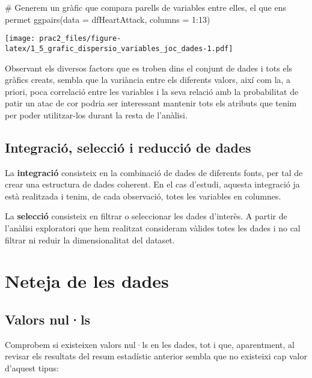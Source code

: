 \documentclass[
]{article}
\newenvironment{Shaded}{\begin{snugshade}}{\end{snugshade}}
\newcommand{\AttributeTok}[1]{\textcolor[rgb]{0.80,0.80,0.80}{#1}}
\newcommand{\CommentTok}[1]{\textcolor[rgb]{0.50,0.62,0.50}{#1}}
\newcommand{\DecValTok}[1]{\textcolor[rgb]{0.86,0.86,0.80}{#1}}
\newcommand{\FunctionTok}[1]{\textcolor[rgb]{0.94,0.94,0.56}{#1}}
\newcommand{\NormalTok}[1]{\textcolor[rgb]{0.80,0.80,0.80}{#1}}
\newcommand{\SpecialCharTok}[1]{\textcolor[rgb]{0.86,0.64,0.64}{#1}}
\begin{document}
\begin{Shaded}
\begin{Highlighting}[]
\CommentTok{\# Generem un gràfic que compara parells de variables entre elles, el que ens permet}
\FunctionTok{ggpairs}\NormalTok{(}\AttributeTok{data =}\NormalTok{ dfHeartAttack, }\AttributeTok{columns =} \DecValTok{1}\SpecialCharTok{:}\DecValTok{13}\NormalTok{)}
\end{Highlighting}
\end{Shaded}

\texttt{[image: prac2\_files/figure-latex/1\_5\_grafic\_dispersio\_variables\_joc\_dades-1.pdf]}

Observant els diversos factors que es troben dins el conjunt de dades i
tots els gràfics creats, sembla que la variància entre els diferents
valors, així com la, a priori, poca correlació entre les variables i la
seva relació amb la probabilitat de patir un atac de cor podria ser
interessant mantenir tots els atributs que tenim per poder utilitzar-los
durant la resta de l'anàlisi.

\hypertarget{integraciuxf3-selecciuxf3-i-reducciuxf3-de-dades}{%
\subsection{Integració, selecció i reducció de
dades}\label{integraciuxf3-selecciuxf3-i-reducciuxf3-de-dades}}

La \textbf{integració} consisteix en la combinació de dades de diferents
fonts, per tal de crear una estructura de dades coherent. En el cas
d'estudi, aquesta integració ja està realitzada i tenim, de cada
observació, totes les variables en columnes.

La \textbf{selecció} consisteix en filtrar o seleccionar les dades
d'interès. A partir de l'anàlisi exploratori que hem realitzat
consideram vàlides totes les dades i no cal filtrar ni reduir la
dimensionalitat del dataset.

\hypertarget{neteja-de-les-dades}{%
\section{Neteja de les dades}\label{neteja-de-les-dades}}

\hypertarget{valors-nulls}{%
\subsection{Valors nul·ls}\label{valors-nulls}}

Comprobem si existeixen valors nul·ls en les dades, tot i que,
aparentment, al revisar els resultats del resum estadístic anterior
sembla que no existeixi cap valor d'aquest tipus:
\end{document}
